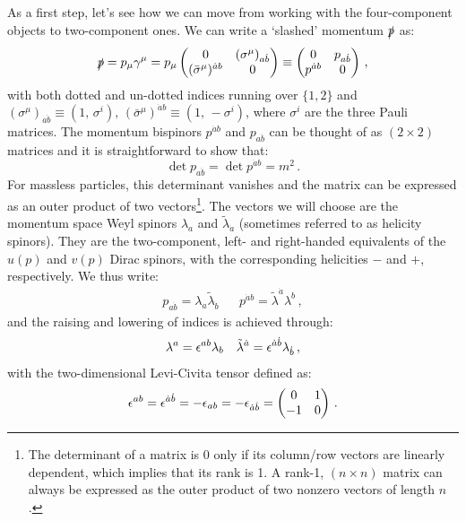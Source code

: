 \documentclass[main.tex]{subfiles}
\begin{document}
As a first step, let's see how we can move from working with the four-component objects to two-component ones. We can write a `slashed' momentum $\slashed{p}$ as:
\begin{equation} \label{eq:pslashed1}
    \slashed{p} = p_\mu \gamma^\mu = p_\mu
    \begin{pmatrix}
    0 & (\sigma^\mu)_{a\dot{b}} \\
    (\bar{\sigma}^\mu)^{\dot{a}b} & 0
    \end{pmatrix}
    \equiv
    \begin{pmatrix}
    0 & p_{a\dot{b}} \\
    p^{\dot{a}b} & 0 
    \end{pmatrix} \, ,
\end{equation}
with both dotted and un-dotted indices running over $\{1,2\}$ and $(\sigma^\mu)_{a\dot{b}} \equiv (1, \, \sigma^i), \, (\bar{\sigma}^\mu)^{\dot{a}b} \equiv (1, \, -\sigma^i)$, where $\sigma^i$ are the three Pauli matrices. The momentum bispinors $p^{\dot{a}b}$ and $p_{a\dot{b}}$ can be thought of as $(2 \times 2)$ matrices and it is straightforward to show that:
\begin{equation}
    \det p_{a\dot{b}} = \det p^{\dot{a}b} = m^2\,.
\end{equation}
For massless particles, this determinant vanishes and the matrix can be expressed as an outer product of two vectors\footnote{The determinant of a matrix is 0 only if its column/row vectors are linearly dependent, which implies that its rank is 1. A rank-1, $(n \times n)$ matrix can always be expressed as the outer product of two nonzero vectors of length $n$.}. The vectors we will choose are the momentum space Weyl spinors $\lambda_a$  and $\tilde{\lambda}_{\dot{a}}$ (sometimes referred to as helicity spinors). They are the two-component, left- and right-handed equivalents of the $u(p)$ and $v(p)$ Dirac spinors, with the corresponding helicities $-$ and $+$, respectively. We thus write:
\begin{align} \label{eq:outerproduct}
    p_{a\dot{b}} = \lambda_a \tilde{\lambda}_{\dot{b}} && p^{\dot{a}b} = \tilde{\lambda}^{\dot{a}} \lambda^b\,,
\end{align}
and the raising and lowering of indices is achieved through:
\begin{align}
    \lambda^a = \epsilon^{ab} \lambda_b && \tilde{\lambda}^{\dot{a}} = \epsilon^{\dot{a}\dot{b}} \lambda_{\dot{b}} \,,
\end{align}
with the two-dimensional Levi-Civita tensor defined as:
\begin{equation}
    \epsilon^{ab} = \epsilon^{\dot{a}\dot{b}} = -\epsilon_{ab} = -\epsilon_{\dot{a}\dot{b}} = 
    \begin{pmatrix}
        0 & 1 \\
        -1 & 0
    \end{pmatrix}\,.
\end{equation}
\end{document}
